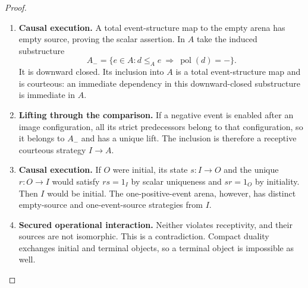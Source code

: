 \documentclass[11pt,a4paper]{article}
\numberwithin{equation}{section}
\theoremstyle{definition}
\theoremstyle{remark}
\theoremstyle{plain}
\begin{document}
\begin{proof}
\leavevmode
\begin{enumerate}[label=\textup{(\arabic*)},leftmargin=*,itemsep=4pt,topsep=3pt]
  \item \textbf{Causal execution.} A total event-structure map to the empty arena has empty source, proving
the scalar assertion. In $A$ take the induced substructure
\[
 A_- = \{e\in A: d\leq_A e\ \Longrightarrow\ \operatorname{pol}(d)=-\}.
\]
It is downward closed. Its inclusion into $A$ is a total event-structure
map and is courteous: an immediate dependency in this downward-closed
substructure is immediate in $A$.
  \item \textbf{Lifting through the comparison.} If a negative event is enabled after
an image configuration, all its strict predecessors belong to that
configuration, so it belongs to $A_-$ and has a unique lift. The inclusion
is therefore a receptive courteous strategy $I\to A$.
  \item \textbf{Causal execution.} If $O$ were initial, its state $s:I\to O$ and the unique $r:O\to I$
would satisfy $rs=1_I$ by scalar uniqueness and $sr=1_O$ by initiality. Then $I$ would be initial. The one-positive-event arena, however, has
distinct empty-source and one-event-source strategies from $I$.
  \item \textbf{Secured operational interaction.} Neither
violates receptivity, and their sources are not isomorphic. This is a
contradiction. Compact duality exchanges initial and terminal objects,
so a terminal object is impossible as well.
\end{enumerate}
\end{proof}
\end{document}
